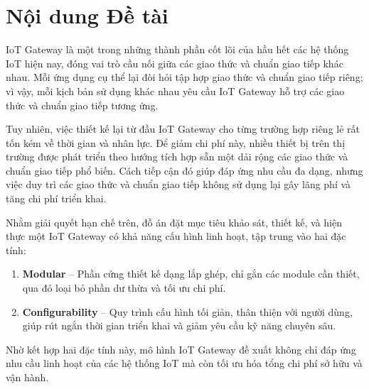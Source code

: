 \section{Nội dung Đề tài}
    IoT Gateway là một trong những thành phần cốt lõi của hầu hết các hệ thống IoT hiện nay, đóng vai trò cầu nối giữa các giao thức và chuẩn giao tiếp khác nhau. Mỗi ứng dụng cụ thể lại đòi hỏi tập hợp giao thức và chuẩn giao tiếp riêng; vì vậy, mỗi kịch bản sử dụng khác nhau yêu cầu IoT Gateway hỗ trợ các giao thức và chuẩn giao tiếp tương ứng.\par

    Tuy nhiên, việc thiết kế lại từ đầu IoT Gateway cho từng trường hợp riêng lẻ rất tốn kém về thời gian và nhân lực. Để giảm chi phí này, nhiều thiết bị trên thị trường được phát triển theo hướng tích hợp sẵn một dải rộng các giao thức và chuẩn giao tiếp phổ biến. Cách tiếp cận đó giúp đáp ứng nhu cầu đa dạng, nhưng việc duy trì các giao thức và chuẩn giao tiếp không sử dụng lại gây lãng phí và tăng chi phí triển khai.\par
    
    Nhằm giải quyết hạn chế trên, đồ án đặt mục tiêu khảo sát, thiết kế, và hiện thực một IoT Gateway có khả năng cấu hình linh hoạt, tập trung vào hai đặc tính:\par
    \begin{enumerate}
        \item \textbf{Modular} – Phần cứng thiết kế dạng lắp ghép, chỉ gắn các module cần thiết, qua đó loại bỏ phần dư thừa và tối ưu chi phí.
        \item \textbf{Configurability} – Quy trình cấu hình tối giản, thân thiện với người dùng, giúp rút ngắn thời gian triển khai và giảm yêu cầu kỹ năng chuyên sâu.
    \end{enumerate}
    
    Nhờ kết hợp hai đặc tính này, mô hình IoT Gateway đề xuất không chỉ đáp ứng nhu cầu linh hoạt của các hệ thống IoT mà còn tối ưu hóa tổng chi phí sở hữu và vận hành.
